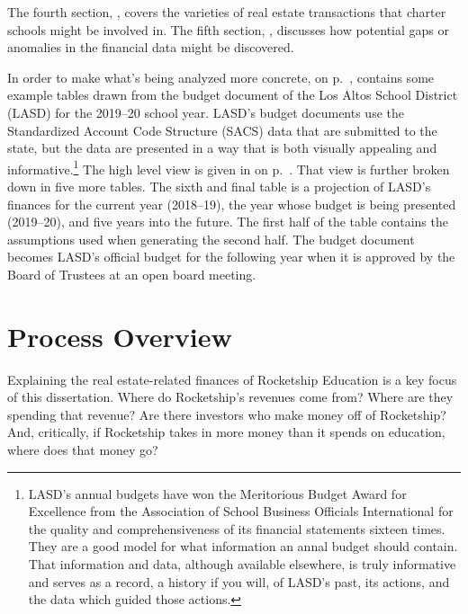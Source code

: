 The fourth section, , covers the varieties of real estate transactions that charter schools might be involved in. The fifth section, , discusses how potential gaps or anomalies in the financial data might be discovered. 

 In order to make what's being analyzed more concrete,  on p.~\pageref{appx:ca-school-financing}, contains some example tables drawn from the budget document of the Los Altos School District (LASD) for the 2019–20 school year. LASD's budget documents use the Standardized Account Code Structure (SACS) data that are submitted to the state, but the data are presented in a way that is both visually appealing and informative.\footnote{LASD's annual budgets have won the Meritorious Budget Award for Excellence from the Association of School Business Officials International for the quality and comprehensiveness of its financial statements sixteen times. They are a good model for what information an annal budget should contain. That information and data, although available elsewhere, is truly informative and serves as a record, a history if you will, of LASD's past, its actions, and the data which guided those actions.} The high level view is given in  on p.~\pageref{fig:LASD_All_Funds_Summary}. That view is further broken down in five more tables. The sixth and final table is a projection of LASD's finances for the current year (2018–19), the year whose budget is being presented (2019–20), and five years into the future. The first half of the table contains the assumptions used when generating the second half. The budget document becomes LASD's official budget for the following year when it is approved by the Board of Trustees at an open board meeting. 

\section{Process Overview}\label{sec:process-overview}\indent%

Explaining the real estate-related finances of Rocketship Education is a key focus of this dissertation. Where do Rocketship's revenues come from? Where are they spending that revenue? Are there investors who make money off of Rocketship? And, critically, if Rocketship takes in more money than it spends on education, where does that money go?

